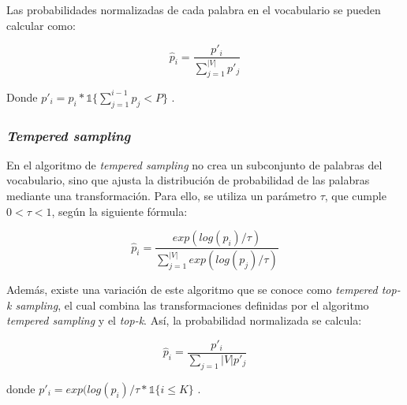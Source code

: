 \documentclass[11pt,spanish,listoffigures,listoftables]{tfgetsinf}
\begin{document}
Las probabilidades normalizadas de cada palabra en el vocabulario se pueden calcular como:

\begin{equation}
\hat{p}_i = \frac{p'_i}{\sum_{j = 1}^{|V|} p'_j}
\end{equation}

Donde $p'_i = p_i * \mathbb{1}\{\sum_{j = 1}^{i-1}p_j < P\}$ \cite{nadeem2020systematiccharacterizationsamplingalgorithms}.

\subsubsection{\textit{Tempered sampling}}

En el algoritmo de \textit{tempered sampling} \cite{nadeem2020systematiccharacterizationsamplingalgorithms} no crea un subconjunto de palabras del vocabulario, sino que ajusta la distribución de probabilidad de las palabras mediante una transformación. Para ello, se utiliza un parámetro $\tau$, que cumple $0 < \tau < 1$, según la siguiente fórmula:

\begin{equation}
\hat{p}_i = \frac{exp(log(p_i)/\tau)}{\sum_{j = 1}^{|V|}exp(log(p_j)/\tau)}
\end{equation}

Además, existe una variación de este algoritmo que se conoce como \textit{tempered top-k sampling}, el cual combina las transformaciones definidas por el algoritmo \textit{tempered sampling} y el \textit{top-k}. Así, la probabilidad normalizada se calcula:

\begin{equation}
\hat{p}_i = \frac{p'_i}{\sum_{j = 1}{|V|}p'_j}
\end{equation}

donde $p'_i = exp(log(p_i)/\tau * \mathbb{1}\{i \leq K\}$ .



\end{document}
